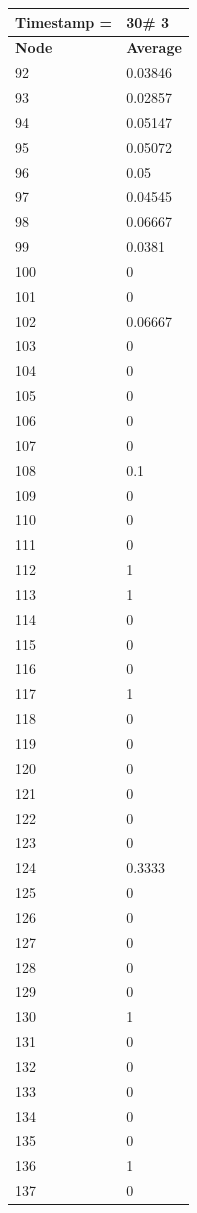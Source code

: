 \begin{tabular}{|l||l|}
\hline
\textbf{Timestamp =} & \textbf{30}\# 3\\\hline
	\textbf{Node} & \textbf{Average} \\ \hline
\hline
	92 & 0.03846 \\ \hline
	93 & 0.02857 \\ \hline
	94 & 0.05147 \\ \hline
	95 & 0.05072 \\ \hline
	96 & 0.05 \\ \hline
	97 & 0.04545 \\ \hline
	98 & 0.06667 \\ \hline
	99 & 0.0381 \\ \hline
	100 & 0 \\ \hline
	101 & 0 \\ \hline
	102 & 0.06667 \\ \hline
	103 & 0 \\ \hline
	104 & 0 \\ \hline
	105 & 0 \\ \hline
	106 & 0 \\ \hline
	107 & 0 \\ \hline
	108 & 0.1 \\ \hline
	109 & 0 \\ \hline
	110 & 0 \\ \hline
	111 & 0 \\ \hline
	112 & 1 \\ \hline
	113 & 1 \\ \hline
	114 & 0 \\ \hline
	115 & 0 \\ \hline
	116 & 0 \\ \hline
	117 & 1 \\ \hline
	118 & 0 \\ \hline
	119 & 0 \\ \hline
	120 & 0 \\ \hline
	121 & 0 \\ \hline
	122 & 0 \\ \hline
	123 & 0 \\ \hline
	124 & 0.3333 \\ \hline
	125 & 0 \\ \hline
	126 & 0 \\ \hline
	127 & 0 \\ \hline
	128 & 0 \\ \hline
	129 & 0 \\ \hline
	130 & 1 \\ \hline
	131 & 0 \\ \hline
	132 & 0 \\ \hline
	133 & 0 \\ \hline
	134 & 0 \\ \hline
	135 & 0 \\ \hline
	136 & 1 \\ \hline
	137 & 0 \\ \hline
\end{tabular}

